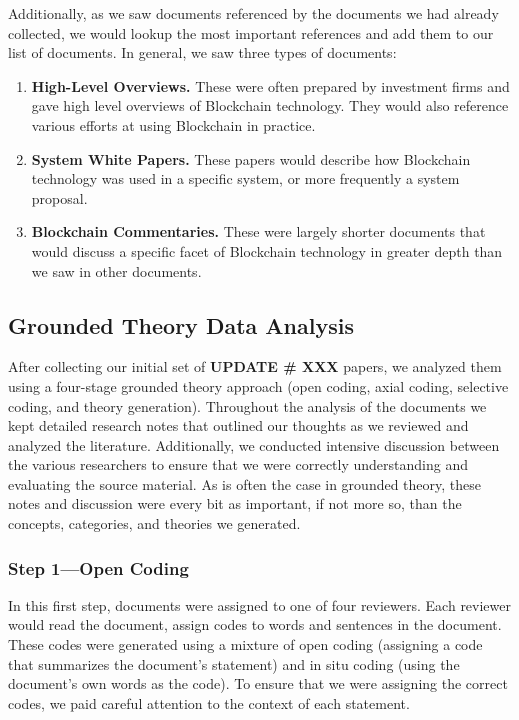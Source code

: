 Additionally, as we saw documents referenced by the documents we had already collected, we would lookup the most important references and add them to our list of documents. In general, we saw three types of documents:

\begin{enumerate}
	\item \textbf{High-Level Overviews.} These were often prepared by investment firms and gave high level overviews of Blockchain technology. They would also reference various efforts at using Blockchain in practice.
	\item \textbf{System White Papers.} These papers would describe how Blockchain technology was used in a specific system, or more frequently a system proposal.
	\item \textbf{Blockchain Commentaries.} These were largely shorter documents that would discuss a specific facet of Blockchain technology in greater depth than we saw in other documents.
\end{enumerate}

\subsection{Grounded Theory Data Analysis}
After collecting our initial set of \textbf{UPDATE \# XXX} papers, we analyzed them using a four-stage grounded theory approach (open coding, axial coding, selective coding, and theory generation).
Throughout the analysis of the documents we kept detailed research notes that outlined our thoughts as we reviewed and analyzed the literature.
Additionally, we conducted intensive discussion between the various researchers to ensure that we were correctly understanding and evaluating the source material.
As is often the case in grounded theory, these notes and discussion were every bit as important, if not more so, than the concepts, categories, and theories we generated.

\subsubsection{Step 1---Open Coding}
In this first step, documents were assigned to one of four reviewers.
Each reviewer would read the document, assign codes to words and sentences in the document.
These codes were generated using a mixture of open coding (assigning a code that summarizes the document's statement) and in situ coding (using the document's own words as the code).
To ensure that we were assigning the correct codes, we paid careful attention to the context of each statement.

